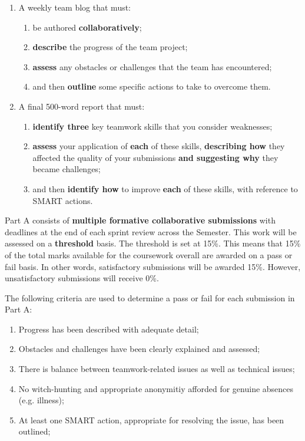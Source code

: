 \documentclass{../fal_assignment}
\begin{document}
\begin{enumerate}[label=(\alph*)]
    \item A weekly team blog that must:
    	\begin{enumerate}[label=\roman*.]
    		\item be authored \textbf{collaboratively};
    		\item \textbf{describe} the progress of the team project;
    		\item \textbf{assess} any obstacles or challenges that the team has encountered;
    		\item and then \textbf{outline} some specific actions to take to overcome them.
	\end{enumerate}
    \item A final 500-word report that must:
    	\begin{enumerate}[label=\roman*.]
    		\item \textbf{identify three} key teamwork skills that you consider weaknesses;
    		\item \textbf{assess} your application of \textbf{each} of these skills, \textbf{describing how} they affected the quality of your submissions \textbf{and suggesting why} they became challenges;
    		\item and then \textbf{identify how} to improve \textbf{each} of these skills, with reference to SMART actions.
	\end{enumerate}
\end{enumerate}

Part A consists of \textbf{multiple formative collaborative submissions} with deadlines at the end of each sprint review across the Semester. This work will be assessed on a \textbf{threshold} basis. The threshold is set at 15\%. This means that 15\% of the total marks available for the coursework overall are awarded on a pass or fail basis. In other words, satisfactory submissions will be awarded 15\%. However, unsatisfactory submissions will receive 0\%.

The following criteria are used to determine a pass or fail for each submission in Part A:

\begin{enumerate}[label=(\alph*)]
	\item Progress has been described with adequate detail;
	\item Obstacles and challenges have been clearly explained and assessed;
	\item There is balance between teamwork-related issues as well as technical issues;
	\item No witch-hunting and appropriate anonymitiy afforded for genuine absences (e.g. illness);
	\item At least one SMART action, appropriate for resolving the issue, has been outlined;
\end{enumerate}
\end{document}
